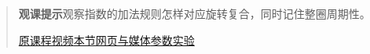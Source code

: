 \begin{quote}\small\textbf{观课提示}\quad 观察指数的加法规则怎样对应旋转复合，同时记住整圈周期性。

\href{https://www.youtube.com/watch?v=ZxYOEwM6Wbk}{原课程视频}\quad\href{https://vitael04213.github.io/3blue1brown-notes/lessons/ldm-eulers-formula.html}{本节网页与媒体}\quad\href{https://vitael04213.github.io/3blue1brown-notes/lab.html\#complex}{参数实验}
\end{quote}
